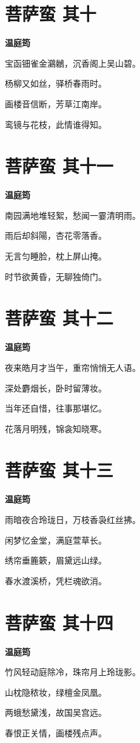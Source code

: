 \documentclass[12pt,a4paper]{ctexbook}
\begin{document}
\section{菩萨蛮 其十}
\textbf{温庭筠}\par\vspace{0.5em}
宝函钿雀金鸂鶒，沉香阁上吴山碧。\par
杨柳又如丝，驿桥春雨时。\par
画楼音信断，芳草江南岸。\par
鸾镜与花枝，此情谁得知。\par

\section{菩萨蛮 其十一}
\textbf{温庭筠}\par\vspace{0.5em}
南园满地堆轻絮，愁闻一霎清明雨。\par
雨后却斜陽，杏花零落香。\par
无言匀睡脸，枕上屏山掩。\par
时节欲黄昏，无聊独倚门。\par

\section{菩萨蛮 其十二}
\textbf{温庭筠}\par\vspace{0.5em}
夜来皓月才当午，重帘悄悄无人语。\par
深处麝烟长，卧时留薄妆。\par
当年还自惜，往事那堪忆。\par
花落月明残，锦衾知晓寒。\par

\section{菩萨蛮 其十三}
\textbf{温庭筠}\par\vspace{0.5em}
雨暗夜合玲珑日，万枝香袅红丝拂。\par
闲梦忆金堂，满庭萱草长。\par
绣帘垂簏簌，眉黛远山绿。\par
春水渡溪桥，凭栏魂欲消。\par

\section{菩萨蛮 其十四}
\textbf{温庭筠}\par\vspace{0.5em}
竹风轻动庭除冷，珠帘月上玲珑影。\par
山枕隐秾妆，绿檀金凤凰。\par
两蛾愁黛浅，故国吴宫远。\par
春恨正关情，画楼残点声。\par
\end{document}
